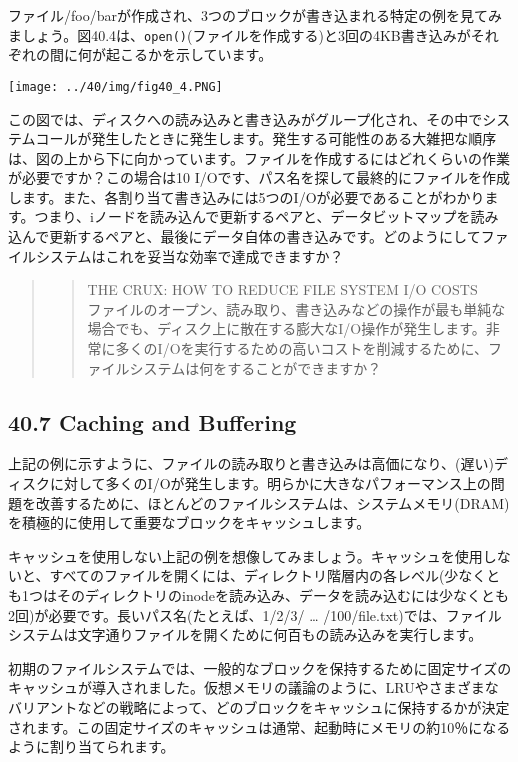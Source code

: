 ファイル/foo/barが作成され、3つのブロックが書き込まれる特定の例を見てみましょう。図40.4は、\texttt{open()}(ファイルを作成する)と3回の4KB書き込みがそれぞれの間に何が起こるかを示しています。

\texttt{[image: ../40/img/fig40\_4.PNG]}

この図では、ディスクへの読み込みと書き込みがグループ化され、その中でシステムコールが発生したときに発生します。発生する可能性のある大雑把な順序は、図の上から下に向かっています。ファイルを作成するにはどれくらいの作業が必要ですか？この場合は10
I/Oです、パス名を探して最終的にファイルを作成します。また、各割り当て書き込みには5つのI/Oが必要であることがわかります。つまり、iノードを読み込んで更新するペアと、データビットマップを読み込んで更新するペアと、最後にデータ自体の書き込みです。どのようにしてファイルシステムはこれを妥当な効率で達成できますか？

\begin{quote}
\begin{quote}
THE CRUX: HOW TO REDUCE FILE SYSTEM I/O COSTS\\
ファイルのオープン、読み取り、書き込みなどの操作が最も単純な場合でも、ディスク上に散在する膨大なI/O操作が発生します。非常に多くのI/Oを実行するための高いコストを削減するために、ファイルシステムは何をすることができますか？
\end{quote}
\end{quote}

\hypertarget{caching-and-buffering}{%
\subsection*{40.7 Caching and Buffering}\label{caching-and-buffering}}

上記の例に示すように、ファイルの読み取りと書き込みは高価になり、(遅い)ディスクに対して多くのI/Oが発生します。明らかに大きなパフォーマンス上の問題を改善するために、ほとんどのファイルシステムは、システムメモリ(DRAM)を積極的に使用して重要なブロックをキャッシュします。

キャッシュを使用しない上記の例を想像してみましょう。キャッシュを使用しないと、すべてのファイルを開くには、ディレクトリ階層内の各レベル(少なくとも1つはそのディレクトリのinodeを読み込み、データを読み込むには少なくとも2回)が必要です。長いパス名(たとえば、1/2/3/
\ldots{}
/100/file.txt)では、ファイルシステムは文字通りファイルを開くために何百もの読み込みを実行します。

初期のファイルシステムでは、一般的なブロックを保持するために固定サイズのキャッシュが導入されました。仮想メモリの議論のように、LRUやさまざまなバリアントなどの戦略によって、どのブロックをキャッシュに保持するかが決定されます。この固定サイズのキャッシュは通常、起動時にメモリの約10％になるように割り当てられます。

